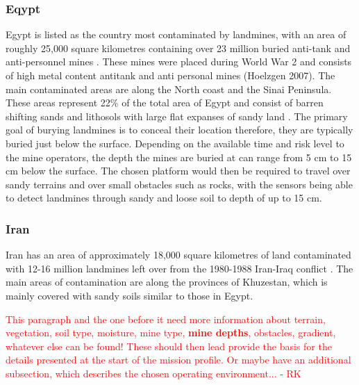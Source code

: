 \documentclass[main.tex]{subfiles}
\begin{document}
\subsubsection{Eqypt}
Egypt is listed as the country most contaminated by landmines, with an area of roughly 25,000 square kilometres containing over 23 million buried anti-tank and anti-personnel mines \parencite{Rushfan2008}. These mines were placed during World War 2 and consists of high metal content antitank and anti personal mines (Hoelzgen 2007). The main contaminated areas are along the North coast and the Sinai Peninsula. These areas represent 22\% of the total area of Egypt and consist of barren shifting sands and lithosols with large flat expanses of sandy land \parencite{Nahrawy2011}. The primary goal of burying landmines is to conceal their location therefore, they are typically buried just below the surface. Depending on the available time and risk level to the mine operators, the depth the mines are buried at can range from 5 cm to 15 cm below the surface. The chosen platform would then be required to travel over sandy terrains and over small obstacles such as rocks, with the sensors being able to detect landmines through sandy and loose soil to depth of up to 15 cm. 
 \subsubsection{Iran}
Iran has an area of approximately 18,000 square kilometres of land contaminated with 12-16 million landmines left over from the 1980-1988 Iran-Iraq conflict \parencite{landmineMonitor2015}. The main areas of contamination are along the provinces of Khuzestan, which is mainly covered with sandy soils similar to those in Egypt. 

\textcolor{red}{This paragraph and the one before it need more information about terrain, vegetation, soil type, moisture, mine type, \textbf{mine depths}, obstacles, gradient, whatever else can be found! These should then lead provide the basis for the details presented at the start of the mission profile. Or maybe have an additional subsection, which describes the chosen operating environment... - RK}
\end{document}
